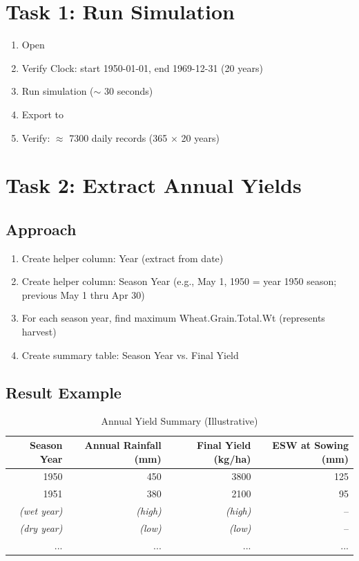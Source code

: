 \section{Task 1: Run Simulation}

\begin{enumerate}
  \item Open 
  \item Verify Clock: start 1950-01-01, end 1969-12-31 (20 years)
  \item Run simulation ($\sim$ 30 seconds)
  \item Export to 
  \item Verify: $\approx$ 7300 daily records (365 × 20 years)
\end{enumerate}

\section{Task 2: Extract Annual Yields}

\subsection{Approach}

\begin{enumerate}
  \item Create helper column: Year (extract from date)
  \item Create helper column: Season Year (e.g., May 1, 1950 = year 1950 season; previous May 1 thru Apr 30)
  \item For each season year, find maximum Wheat.Grain.Total.Wt (represents harvest)
  \item Create summary table: Season Year vs. Final Yield
\end{enumerate}

\subsection{Result Example}

\begin{table}[H]
\centering
\caption{Annual Yield Summary (Illustrative)}
\label{tab:annual-yield}
\begin{tabularx}{\textwidth}{r|r|r|r}
\toprule
\textbf{Season Year} & \textbf{Annual Rainfall (mm)} & \textbf{Final Yield (kg/ha)} & \textbf{ESW at Sowing (mm)} \\
\midrule
1950 & 450 & 3800 & 125 \\
1951 & 380 & 2100 & 95 \\
\textit{(wet year)} & \textit{(high)} & \textit{(high)} & -- \\
\textit{(dry year)} & \textit{(low)} & \textit{(low)} & -- \\
... & ... & ... & ... \\
\bottomrule
\end{tabularx}
\end{table}

